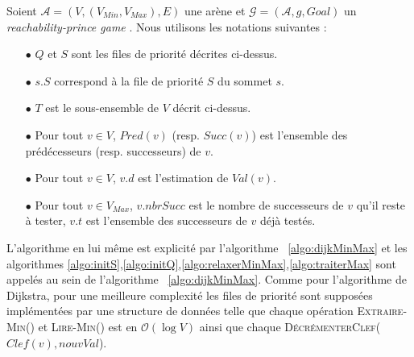 Soient $\mathcal{A} = (V, (V_{Min}, V_{Max}), E) $ une arène et $\mathcal{G} = (\mathcal{A}, g, Goal)$ un \og \textit{reachability-prince game} \fg. Nous utilisons les notations suivantes : 
\begin{enumerate} 
	\item[$\bullet$]$Q$ et $S$ sont les files de priorité décrites ci-dessus.
	\item[$\bullet$]$s.S$  correspond à la file de priorité $S$ du sommet $s$.
	\item[$\bullet$]$T$ est le sous-ensemble de $V$ décrit ci-dessus.
	\item[$\bullet$]Pour tout $v \in V$, $Pred(v)$ (resp. $Succ(v)$) est l'ensemble des prédécesseurs (resp. successeurs) de $v$.
	\item[$\bullet$]Pour tout $v \in V$, $v.d$ est l'estimation de $Val(v)$.
	\item[$\bullet$]Pour tout $v \in V_{Max}$, $v.nbrSucc$ est le nombre de successeurs de $v$ qu'il reste à tester, $v.t$ est l'ensemble des successeurs de $v$ déjà testés.
\end{enumerate}

L'algorithme en lui même est explicité par l'algorithme ~\ref{algo:dijkMinMax} et les algorithmes \ref{algo:initS},\ref{algo:initQ},\ref{algo:relaxerMinMax},\ref{algo:traiterMax} sont appelés au sein de l'algorithme ~\ref{algo:dijkMinMax}.
Comme pour l'algorithme de Dijkstra, pour une meilleure complexité les files de priorité sont supposées implémentées par une structure de données telle que chaque opération \textsc{Extraire-Min}() et \textsc{Lire-Min()} est en $\mathcal{O}(\log V)$ ainsi que chaque \textsc{DécrémenterClef}($Clef(v),nouvVal$).\\ 


